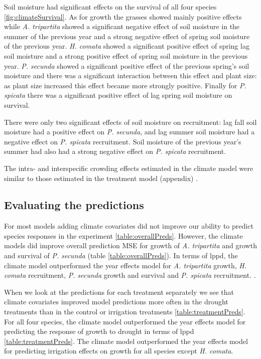 \documentclass[11pt]{article}
\begin{document}
\begin{doublespacing}
Soil moisture had significant effects on the survival of all four species \ref{fig:climateSurvival}. As for growth the grasses showed mainly positive effects while \textit{A. tripartita} showed a significant negative effect of soil moisture in the summer of the previous year and a strong negative effect of spring soil moisture of the previous year. \textit{H. comata} showed a significant positive effect of spring lag soil moisture and a strong positive effect of spring soil moisture in the previous year. \textit{P. secunda} showed a significant positive effect of the previous spring's soil moisture and there was a significant interaction between this effect and plant size: as plant size increased this effect became more strongly positive. Finally for \textit{P. spicata} there was a significant positive effect of lag spring soil moisture on survival.

There were only two significant effects of soil moisture on recruitment: lag fall soil moisture had a positive effect on \textit{P. secunda}, and lag summer soil moisture had a negative effect on \textit{P. spicata} recruitment. Soil moisture of the previous year's summer had also had a strong negative effect on \textit{P. spicata} recruitment.  

The intra- and interspecific crowding effects estimated in the climate model were similar to those estimated in the treatment model (appendix) \citep{adler_coexistence_2010,chu_direct_2016,chu_large_2015}.

\subsection*{Evaluating the predictions}

For most models adding climate covariates did not improve our ability to predict species responses in the experiment \ref{table:overallPreds}. However, the climate models did improve overall prediction MSE for growth of \textit{A. tripartita} and growth and survival of \textit{P. secunda} (table \ref{table:overallPreds}). In terms of lppd, the climate model outperformed the year effects model for \textit{A. tripartita} growth, \textit{H. comata} recruitment, \textit{P. secunda} growth and survival and \textit{P. spicata} recruitment.  .

When we look at the predictions for each treatment separately we see that climate covariates improved model predictions more often in the drought treatments than in the control or irrigation treatments \ref{table:treatmentPreds}. For all four species, the climate model outperformed the year effects model for predicting the response of growth to drought in terms of lppd \ref{table:treatmentPreds}. The climate model outperformed the year effects model for predicting irrigation effects on growth for all species except \textit{H. comata}. 


\end{doublespacing}
\end{document}
